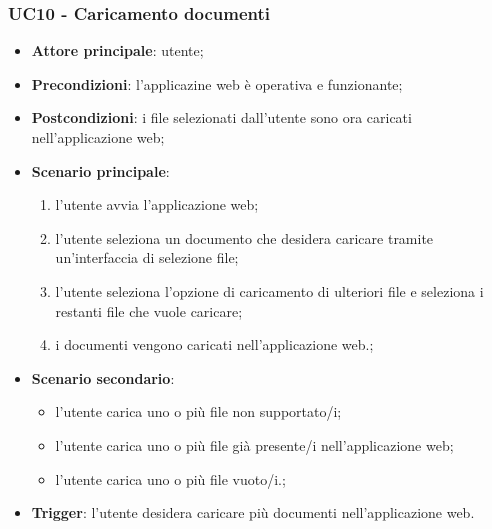 \documentclass[10pt, a4paper]{article}
\begin{document}
    \subsubsection{UC10 - Caricamento documenti} 
    \begin{itemize}
        \item \textbf{Attore principale}: utente;
        \item \textbf{Precondizioni}: l'applicazine web è operativa e funzionante;
        \item \textbf{Postcondizioni}: i file selezionati dall'utente sono ora caricati nell'applicazione web;
        \item \textbf{Scenario principale}:
            \begin{enumerate}
                \item l'utente avvia l'applicazione web;
                \item l'utente seleziona un documento che desidera caricare tramite un'interfaccia di selezione file;
                \item l'utente seleziona l'opzione di caricamento di ulteriori file e seleziona i restanti file che vuole caricare;
                \item i documenti vengono caricati nell'applicazione web.;
            \end{enumerate}
        \item \textbf{Scenario secondario}:
            \begin{itemize}
                \item l'utente carica uno o più file non supportato/i;
                \item l'utente carica uno o più file già presente/i nell'applicazione web;
                \item l'utente carica uno o più file vuoto/i.;
            \end{itemize}
        \item \textbf{Trigger}: l'utente desidera caricare più documenti nell'applicazione web.
    \end{itemize}
\end{document}
